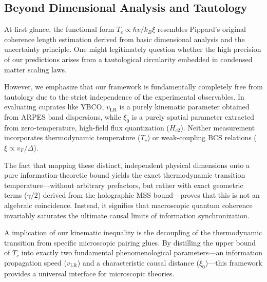 \documentclass[11pt,a4paper]{article}
\begin{document}
\subsection*{Beyond Dimensional Analysis and Tautology}

At first glance, the functional form $T_c \propto \hbar v / k_B \xi$ resembles Pippard's original coherence length estimation derived from basic dimensional analysis and the uncertainty principle. One might legitimately question whether the high precision of our predictions arises from a tautological circularity embedded in condensed matter scaling laws.

However, we emphasize that our framework is fundamentally completely free from tautology due to the strict independence of the experimental observables. In evaluating cuprates like YBCO, $v_{\text{LR}}$ is a purely kinematic parameter obtained from ARPES band dispersions, while $\xi_0$ is a purely spatial parameter extracted from zero-temperature, high-field flux quantization ($H_{c2}$). Neither measurement incorporates thermodynamic temperature ($T_c$) or weak-coupling BCS relations ($\xi \propto v_F / \Delta$).

The fact that mapping these distinct, independent physical dimensions onto a pure information-theoretic bound yields the exact thermodynamic transition temperature—without arbitrary prefactors, but rather with exact geometric terms ($\gamma/2$) derived from the holographic MSS bound—proves that this is not an algebraic coincidence. Instead, it signifies that macroscopic quantum coherence invariably saturates the ultimate causal limits of information synchronization.


A implication of our kinematic inequality is the decoupling of the thermodynamic transition from specific microscopic pairing glues. By distilling the upper bound of $T_c$ into exactly two fundamental phenomenological parameters—an information propagation speed ($v_{\text{LR}}$) and a characteristic causal distance ($\xi_0$)—this framework provides a universal interface for microscopic theories.
\end{document}
